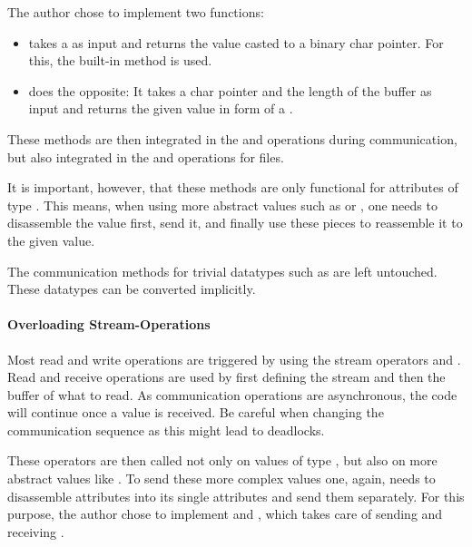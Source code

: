 The author chose to implement two functions:
\begin{itemize}
    \item {} takes a  as input and returns the value casted to a binary char pointer.
    For this, the built-in method  is used.
    \item {} does the opposite: It takes a char pointer and the length of the buffer as input and returns the given value in form of a .
\end{itemize} 

These methods are then integrated in the  and  operations during communication, but also integrated in the  and  operations for files.

It is important, however, that these methods are only functional for attributes of type .
This means, when using more abstract values such as  or , one needs to disassemble the value first, send it, and finally use these pieces to reassemble it to the given value.

The communication methods for trivial datatypes such as  are left untouched.
These datatypes can be converted implicitly.

\paragraph{Overloading Stream-Operations}\label{par:overloadingStreamOperations}
Most read and write operations are triggered by using the stream operators \code{<<} and \code{>>}.
Read and receive operations are used by first defining the stream and then the buffer of what to read.
As communication operations are asynchronous, the code will continue once a value is received.
Be careful when changing the communication sequence as this might lead to deadlocks.

These operators are then called not only on values of type , but also on more abstract values like .
To send these more complex values one, again, needs to disassemble attributes into its single attributes and send them separately.
For this purpose, the author chose to implement  and , which takes care of sending and receiving .

